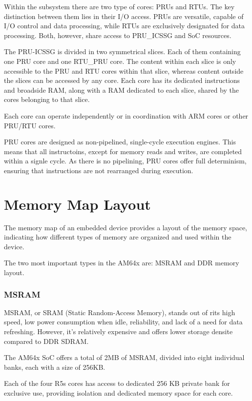 Within the subsystem there are two type of cores: PRUs and RTUs. The key
distinction between them lies in their I/O access. PRUs are versatile,
capable of I/O control and data processing, while RTUs are exclusively
designated for data processing. Both, however, share access to PRU\_ICSSG and
SoC resources.

The PRU-ICSSG is divided in two symmetrical slices. Each of them containing
one PRU core and one RTU\_PRU core.
The content within each slice is only accessible to the PRU and RTU cores
within that slice, whereas content outside the slices can be accessed by any
core.
Each core has its dedicated instructions and broadside RAM, along with a RAM
dedicated to each slice, shared by the cores belonging to that slice.

Each core can operate independently or in coordination with ARM cores or other
PRU/RTU cores.

PRU cores are designed as non-pipelined, single-cycle execution engines. This
means that all instructoins, except for memory reads and writes, are completed
within a signle cycle. As there is no pipelining, PRU cores offer full
determinism, ensuring that instructions are not rearranged during execution.

\section{Memory Map Layout}

The memory map of an embedded device provides a layout of the memory space,
indicating how different types of memory are organized and used within the
device.

The two most important types in the AM64x are: MSRAM and DDR memory layout.

\subsubsection{MSRAM}

MSRAM, or SRAM (Static Random-Access Memory), stands out of rits high speed,
low power consumption when idle, reliability, and lack of a need for data
refreshing. However, it's relatively expensive and offers lower storage
densite compared to DDR SDRAM.

The AM64x SoC offers a total of 2MB of MSRAM, divided into eight individual
banks, each with a size of 256KB.

Each of the four R5s cores has access to dedicated 256 KB private bank for
exclusive use, providing isolation and dedicated memory space for each core.

